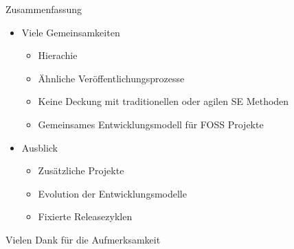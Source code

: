 \documentclass[11pt]{beamer}
\begin{document}
\begin{frame}{Zusammenfassung}
  \begin{itemize}
    \item Viele Gemeinsamkeiten
    \begin{itemize}
    \item Hierachie
    \item Ähnliche Veröffentlichungsprozesse
    \item Keine Deckung mit traditionellen oder agilen SE Methoden
    \item Gemeinsames Entwicklungsmodell für FOSS Projekte
    \end{itemize}
    \item Ausblick
    \begin{itemize}
      \item Zusätzliche Projekte
      \item Evolution der Entwicklungsmodelle
      \item Fixierte Releasezyklen
    \end{itemize}
  \end{itemize}
\end{frame}

\begin{frame}
  \begin{center}
  {\Large Vielen Dank für die Aufmerksamkeit}
  \end{center}
\end{frame}
\end{document}
